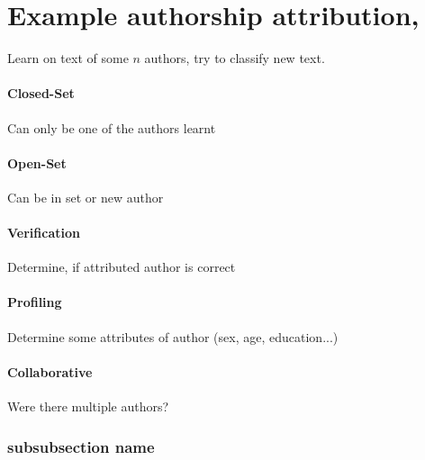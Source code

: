 \documentclass[11pt]{article}
\begin{document}
\section{Example authorship attribution, }
Learn on text of some $n$ authors, try to classify new text. 
\paragraph{Closed-Set} Can only be one of the authors learnt
\paragraph{Open-Set} Can be in set or new author
\paragraph{Verification} Determine, if attributed author is correct
\paragraph{Profiling} Determine some attributes of author (sex, age, education...)
\paragraph{Collaborative} Were there multiple authors?

\subsubsection{subsubsection name}
\label{ssub:}

\end{document}
